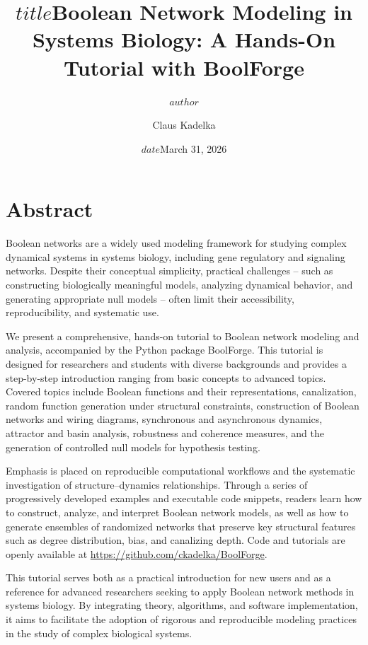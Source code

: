 \documentclass[
]{article}
\title{$title$}
\author{$author$}
\date{$date$}
\title{Boolean Network Modeling in Systems Biology: A Hands-On Tutorial with BoolForge}
\author{Claus Kadelka}
\date{March 31, 2026}
\begin{document}
\maketitle

{
\setcounter{tocdepth}{3}
\tableofcontents
}
\section*{Abstract}\label{abstract}

Boolean networks are a widely used modeling framework for studying
complex dynamical systems in systems biology, including gene regulatory
and signaling networks. Despite their conceptual simplicity, practical
challenges -- such as constructing biologically meaningful models,
analyzing dynamical behavior, and generating appropriate null models --
often limit their accessibility, reproducibility, and systematic use.

We present a comprehensive, hands-on tutorial to Boolean network
modeling and analysis, accompanied by the Python package BoolForge. This
tutorial is designed for researchers and students with diverse
backgrounds and provides a step-by-step introduction ranging from basic
concepts to advanced topics. Covered topics include Boolean functions
and their representations, canalization, random function generation
under structural constraints, construction of Boolean networks and
wiring diagrams, synchronous and asynchronous dynamics, attractor and
basin analysis, robustness and coherence measures, and the generation of
controlled null models for hypothesis testing.

Emphasis is placed on reproducible computational workflows and the
systematic investigation of structure--dynamics relationships. Through a
series of progressively developed examples and executable code snippets,
readers learn how to construct, analyze, and interpret Boolean network
models, as well as how to generate ensembles of randomized networks that
preserve key structural features such as degree distribution, bias, and
canalizing depth. Code and tutorials are openly available at
\url{https://github.com/ckadelka/BoolForge}.

This tutorial serves both as a practical introduction for new users and
as a reference for advanced researchers seeking to apply Boolean network
methods in systems biology. By integrating theory, algorithms, and
software implementation, it aims to facilitate the adoption of rigorous
and reproducible modeling practices in the study of complex biological
systems.
\end{document}
